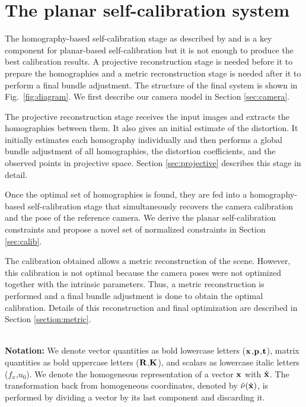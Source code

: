 \documentclass[10pt,twocolumn,letterpaper]{article}
\begin{document}
\section{The planar self-calibration system}

The homography-based self-calibration stage as described by \cite{bocquillon2006} and \cite{gurdjos2003} is a key component for planar-based self-calibration but it is not enough to produce the best calibration results. A projective reconstruction stage is needed before it to prepare the homographies and a metric recronstruction stage is needed after it to perform a final bundle adjustment. The structure of the final system is shown in Fig.~\ref{fig:diagram}. We first describe our camera model in Section \ref{sec:camera}.

The projective reconstruction stage receives the input images and extracts the homographies between them. It also gives an initial estimate of the distortion. It initially estimates each homography individually and then performs a global bundle adjustment of all homographies, the distortion coefficients, and the observed points in projective space. Section \ref{sec:projective} describes this stage in detail.

Once the optimal set of homographies is found, they are fed into a homography-based self-calibration stage that simultaneously recovers the camera calibration and the pose of the reference camera. We derive the planar self-calibration constraints and propose a novel set of normalized constraints in Section \ref{sec:calib}.

The calibration obtained allows a metric reconstruction of the scene. However, this calibration is not optimal because the camera poses were not optimized together with the intrinsic parameters. Thus, a metric reconstruction is performed and a final bundle adjustment is done to obtain the optimal calibration. Details of this reconstruction and final optimization are described in Section \ref{section:metric}.


~\\ \noindent\textbf{Notation:}
We denote vector quantities as bold lowercase letters (\eg $\mathbf{x}$,$\mathbf{p}$,$\mathbf{t}$), matrix quantities as bold uppercase letters (\eg $\mathbf{R}$,$\mathbf{K}$), and scalars as lowercase italic letters (\eg $f_x$,$u_0$). We denote the homogeneous representation of a vector $\mathbf{x}$ with $\hat{\mathbf{x}}$. The transformation back from homogeneous coordinates, denoted by $\check{\nu}(\hat{\mathbf{x}})$, is performed by dividing a vector by its last component and discarding it. 
\end{document}
